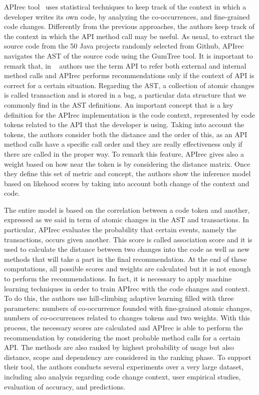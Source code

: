 APIrec tool~\cite{nguyen_api_2016} uses 
statistical techniques to keep track of 
the context in which a developer writes its 
own code, by analyzing the 
co-occurrences, and fine-grained code 
changes. Differently from the previous 
approaches, the authors keep track of the 
context in which the API method call 
may be useful. As usual, to extract the 
source code from the 50 Java projects 
randomly selected from Github, APIrec 
navigates the AST of the source code 
using the GumTree tool. It is important to 
remark that, in 
~\cite{nguyen_api_2016} authors use the 
term API to refer both external and 
internal method calls and APIrec performs 
recommendations only if the context 
of API is correct for a certain situation. 
Regarding the AST, a collection of 
atomic changes is called transaction and is 
stored in a bag, a particular data 
structure that we commonly find in the AST 
definitions. An important concept 
that is a key definition for the APIrec 
implementation is the code context, 
represented by code tokens related to the 
API that the developer is using. 
Taking into account the tokens, the authors 
consider both the distance and the 
order of this, as an API method calls have 
a specific call order and they are 
really effectiveness only if there are 
called in the proper way. To remark this 
feature, APIrec gives also a weight based 
on how near the token is by 
considering the distance matrix. Once they 
define this set of metric and 
concept, the authors show the inference 
model based on likehood scores by 
taking into account both change of the 
context and code.

The entire model is based on the 
correlation between a code token and 
another, 
expressed as we said in term of atomic 
changes in the AST and transactions. In 
particular, APIrec evaluates the 
probability that certain events, namely the 
transactions, occurs given another. This 
score is called association score and 
it is used to calculate the distance 
between two changes into the code as well 
as new methods that will take a part in the 
final recommendation. At the end of 
these computations, all possible scores and 
weights are calculated but it is 
not enough to perform the recommendations. 
In fact, it is necessary to apply 
machine learning techniques in order to 
train APIrec with the code changes and 
context. To do this, the authors use 
hill-climbing adaptive learning filled 
with three parameters: numbers of 
co-occurrence founded with fine-grained 
atomic changes, numbers of co-occurrences 
related to changes tokens and two 
weights. With this process, the necessary 
scores are calculated and APIrec is 
able to perform the recommendation by 
considering the most probable method 
calls for a certain API. The methods are 
also ranked by highest probability of 
usage but also distance, scope and 
dependency are considered in the ranking 
phase. To support their tool, the authors 
conducts several experiments over a 
very large dataset, including also analysis 
regarding code change context, user 
empirical studies, evaluation of accuracy, 
and predictions.



